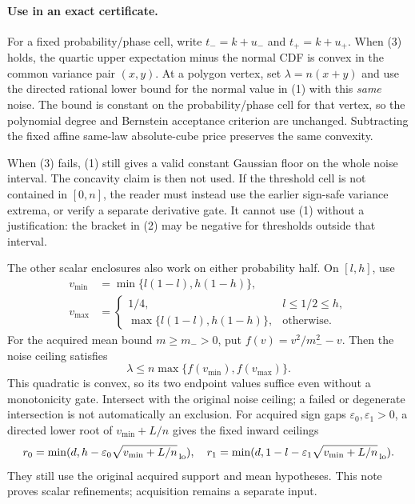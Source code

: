 \documentclass[11pt,a4paper]{article}
\begin{document}
\paragraph{Use in an exact certificate.}
For a fixed probability/phase cell, write $t_-=k+u_-$ and
$t_+=k+u_+$. When (3) holds, the quartic upper expectation minus the
normal CDF is convex in the common variance pair $(x,y)$. At a polygon
vertex, set $\lambda=n(x+y)$ and use the directed rational lower bound
for the normal value in (1) with this \emph{same} noise. The bound is
constant on the probability/phase cell for that vertex, so the polynomial
degree and Bernstein acceptance criterion are unchanged. Subtracting the
fixed affine same-law absolute-cube price preserves the same convexity.

When (3) fails, (1) still gives a valid constant Gaussian floor on the
whole noise interval. The concavity claim is then not used. If the
threshold cell is not contained in $[0,n]$, the reader must instead use
the earlier sign-safe variance extrema, or verify a separate derivative
gate. It cannot use (1) without a justification: the bracket in (2) may
be negative for thresholds outside that interval.

The other scalar enclosures also work on either probability half. On
$[l,h]$, use
\begin{align*}
 v_{\min}&=\min\{l(1-l),h(1-h)\},\\
 v_{\max}&=\begin{cases}
 1/4,&l\le1/2\le h,\\
 \max\{l(1-l),h(1-h)\},&\text{otherwise}.
 \end{cases}
\end{align*}
For the acquired mean bound $m\ge m_->0$, put $f(v)=v^2/m_-^2-v$.
Then the noise ceiling satisfies
\[
 \lambda\le n\max\{f(v_{\min}),f(v_{\max})\}.
\]
This quadratic is convex, so its two endpoint values suffice even
without a monotonicity gate. Intersect with the original noise ceiling;
a failed or degenerate intersection is not automatically an exclusion.
For acquired sign gaps $\varepsilon_0,\varepsilon_1>0$, a directed lower
root of $v_{\min}+L/n$ gives the fixed inward ceilings
\[
 r_0=\min(d,h-\varepsilon_0\sqrt{v_{\min}+L/n}_{\,\rm lo}),\quad
 r_1=\min(d,1-l-\varepsilon_1\sqrt{v_{\min}+L/n}_{\,\rm lo}).
\]
They still use the original acquired support and mean hypotheses. This
note proves scalar refinements; acquisition remains a separate input.
\end{document}
